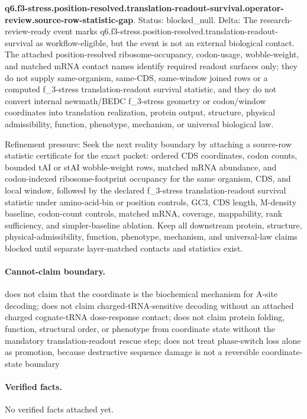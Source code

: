 \textbf{q6.f3-stress.position-resolved.translation-readout-survival.operator-review.source-row-statistic-gap}. Status: blocked\_null. Delta: The research-review-ready event marks q6.f3-stress.position-resolved.translation-readout-survival as workflow-eligible, but the event is not an external biological contact. The attached position-resolved ribosome-occupancy, codon-usage, wobble-weight, and matched mRNA contact names identify required readout surfaces only; they do not supply same-organism, same-CDS, same-window joined rows or a computed f\_3-stress translation-readout survival statistic, and they do not convert internal newmath/BEDC f\_3-stress geometry or codon/window coordinates into translation realization, protein output, structure, physical admissibility, function, phenotype, mechanism, or universal biological law.

Refinement pressure: Seek the next reality boundary by attaching a source-row statistic certificate for the exact packet: ordered CDS coordinates, codon counts, bounded tAI or stAI wobble-weight rows, matched mRNA abundance, and codon-indexed ribosome-footprint occupancy for the same organism, CDS, and local window, followed by the declared f\_3-stress translation-readout survival statistic under amino-acid-bin or position controls, GC3, CDS length, M-density baseline, codon-count controls, matched mRNA, coverage, mappability, rank sufficiency, and simpler-baseline ablation. Keep all downstream protein, structure, physical-admissibility, function, phenotype, mechanism, and universal-law claims blocked until separate layer-matched contacts and statistics exist.

\paragraph{Cannot-claim boundary.} does not claim that the coordinate is the biochemical mechanism for A-site decoding; does not claim charged-tRNA-sensitive decoding without an attached charged cognate-tRNA dose-response contact; does not claim protein folding, function, structural order, or phenotype from coordinate state without the mandatory translation-readout rescue step; does not treat phase-switch loss alone as promotion, because destructive sequence damage is not a reversible coordinate-state boundary

\paragraph{Verified facts.}
No verified facts attached yet.
